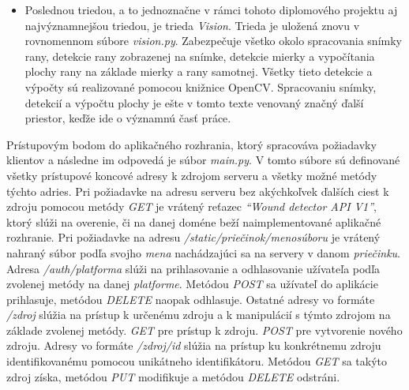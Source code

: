 \begin{itemize}
\item Poslednou triedou, a to jednoznačne v rámci tohoto diplomového projektu aj najvýznamnejšou triedou, je trieda \textit{Vision}. Trieda je uložená znovu v rovnomennom súbore \textit{vision.py}. Zabezpečuje všetko okolo spracovania snímky rany, detekcie rany zobrazenej na snímke, detekcie mierky a vypočítania plochy rany na základe mierky a rany samotnej. Všetky tieto detekcie a výpočty sú realizované pomocou knižnice OpenCV. Spracovaniu snímky, detekcií a výpočtu plochy je ešte v tomto texte venovaný značný ďalší priestor, keďže ide o významnú časť práce.
\end{itemize}

Prístupovým bodom do aplikačného rozhrania, ktorý spracováva požiadavky klientov a následne im odpovedá je súbor \textit{main.py}. V tomto súbore sú definované všetky prístupové koncové adresy k zdrojom serveru a všetky možné metódy týchto adries. Pri požiadavke na adresu serveru bez akýchkoľvek ďalších ciest k zdroju pomocou metódy \textit{GET}  je vrátený reťazec \textit{“Wound detector API V1”}, ktorý slúži na overenie, či na danej doméne beží naimplementované aplikačné rozhranie. Pri požiadavke na adresu \textit{/static/priečinok/menosúboru} je vrátený nahraný súbor podľa svojho \textit{mena} nachádzajúci sa na servery v danom \textit{priečinku}. Adresa \textit{/auth/platforma} slúži na prihlasovanie a odhlasovanie užívateľa podľa zvolenej metódy na danej \textit{platforme}. Metódou \textit{POST} sa užívateľ do aplikácie prihlasuje, metódou \textit{DELETE} naopak odhlasuje. Ostatné adresy vo formáte \textit{/zdroj} slúžia na prístup k určenému zdroju a k manipulácií s týmto zdrojom na základe zvolenej metódy. \textit{GET} pre prístup k zdroju. \textit{POST} pre vytvorenie nového zdroju. Adresy vo formáte \textit{/zdroj/id} slúžia na prístup ku konkrétnemu zdroju identifikovanému pomocou unikátneho identifikátoru. Metódou \textit{GET} sa takýto zdroj získa, metódou \textit{PUT} modifikuje a metódou \textit{DELETE} odstráni. 


